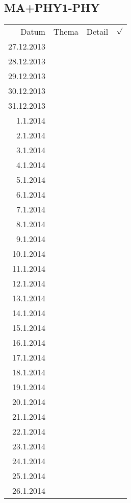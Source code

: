 \subsection{MA+PHY1-PHY}
\begin{tabular}{r l p{} l}
\rowcolor{lgray} Datum       & Thema         & Detail & $\surd$ \\
\rowcolor{white}  27.12.2013 &               &  &  \\
\rowcolor{lgray}  28.12.2013 &               &  &  \\
\rowcolor{white}  29.12.2013 &               &  &  \\
\rowcolor{lgray}  30.12.2013 &               &  &  \\
\rowcolor{white}  31.12.2013 &               &  &  \\
\rowcolor{lgray}    1.1.2014 &               &  &  \\
\rowcolor{white}    2.1.2014 &               &  &  \\
\rowcolor{lgray}    3.1.2014 &               &  &  \\
\rowcolor{white}    4.1.2014 &               &  &  \\
\rowcolor{lgray}    5.1.2014 &               &  &  \\
\rowcolor{white}    6.1.2014 &               &  &  \\
\rowcolor{lgray}    7.1.2014 &               &  &  \\
\rowcolor{white}    8.1.2014 &               &  &  \\
\rowcolor{lgray}    9.1.2014 &               &  &  \\
\rowcolor{white}   10.1.2014 &               &  &  \\
\rowcolor{lgray}   11.1.2014 &               &  &  \\
\rowcolor{white}   12.1.2014 &               &  &  \\
\rowcolor{lgray}   13.1.2014 &               &  &  \\
\rowcolor{white}   14.1.2014 &               &  &  \\
\rowcolor{lgray}   15.1.2014 &               &  &  \\
\rowcolor{white}   16.1.2014 &               &  &  \\
\rowcolor{lgray}   17.1.2014 &               &  &  \\
\rowcolor{white}   18.1.2014 &               &  &  \\
\rowcolor{lgray}   19.1.2014 &               &  &  \\
\rowcolor{white}   20.1.2014 &               &  &  \\
\rowcolor{lgray}   21.1.2014 &               &  &  \\
\rowcolor{white}   22.1.2014 &               &  &  \\
\rowcolor{lgray}   23.1.2014 &               &  &  \\
\rowcolor{white}   24.1.2014 &               &  &  \\
\rowcolor{lgray}   25.1.2014 &               &  &  \\
\rowcolor{white}   26.1.2014 &               &  &  \\
\end{tabular}

